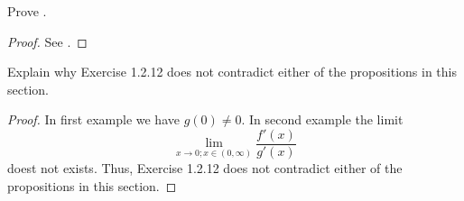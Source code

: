 \exercisesection

\begin{ex}\label{i:ex:10.5.1}
  Prove .
\end{ex}

\begin{proof}
  See .
\end{proof}

\begin{ex}\label{i:ex:10.5.2}
  Explain why Exercise 1.2.12 does not contradict either of the propositions in this section.
\end{ex}

\begin{proof}
  In first example we have \(g(0) \neq 0\).
  In second example the limit
  \[
    \lim_{x \to 0 ; x \in (0, \infty)} \dfrac{f'(x)}{g'(x)}
  \]
  doest not exists.
  Thus, Exercise 1.2.12 does not contradict either of the propositions in this section.
\end{proof}

